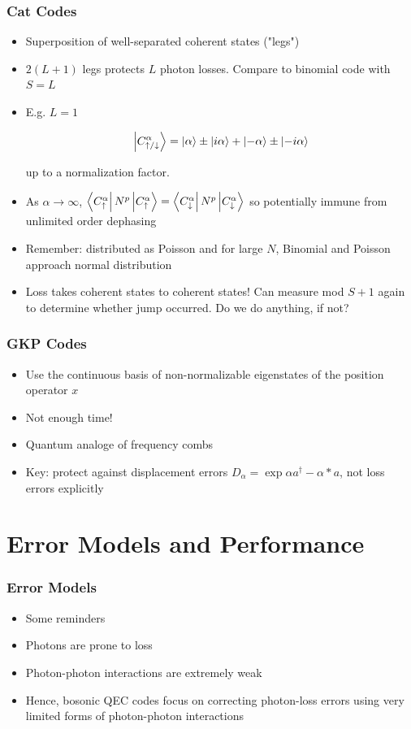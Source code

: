 \documentclass{beamer}
\newcommand\0{\mathbf{0}}
\begin{document}
\begin{frame}
\frametitle{Cat Codes}
\begin{itemize}
\item Superposition of well-separated coherent states ("legs")
\item $2(L+1)$ legs protects $L$ photon losses. Compare to binomial code with $S=L$
\item E.g. $L=1$

$$
\ket{C^\alpha_{\uparrow/\downarrow}} = \ket{\alpha} \pm \ket{i \alpha} + \ket{-\alpha} \pm \ket{-i \alpha} 
$$

up to a normalization factor.
\item As $\alpha \rightarrow \infty$, $\bra{C^\alpha_{\uparrow}} N^p \ket{C^\alpha_{\uparrow}} = \bra{C^\alpha_{\downarrow}} N^p \ket{C^\alpha_{\downarrow}}$ so potentially immune from unlimited order dephasing
\item Remember: distributed as Poisson and for large $N$, Binomial and Poisson approach normal distribution
\item Loss takes coherent states to coherent states! Can measure mod $S+1$ again to determine whether jump occurred. Do we do anything, if not?
\end{itemize}
	
\end{frame}

\begin{frame}
\frametitle{GKP Codes}
\begin{itemize}
\item Use the continuous basis of non-normalizable eigenstates of the position operator $x$	
\item Not enough time!
\item Quantum analoge of frequency combs
\item Key: protect against displacement errors $D_\alpha = \exp{\alpha a^\dag  - \alpha* a}$, not loss errors explicitly
\end{itemize}
	
\end{frame}


\section{Error Models and Performance}

\begin{frame}
\frametitle{Error Models}
\begin{itemize}
\item Some reminders
\item Photons are prone to loss
\item Photon-photon interactions are extremely weak
\item Hence, bosonic QEC codes focus on correcting photon-loss errors using very limited forms of photon-photon interactions
\end{itemize}
\end{frame}
\end{document}
